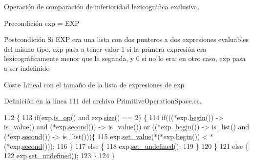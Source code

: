 Operación de comparación de inferioridad lexicográfica exclusiva. 

\begin{DoxyPrecond}{Precondición}
\textquotesingle{}exp\textquotesingle{} = \textquotesingle{}E\+XP\textquotesingle{} 
\end{DoxyPrecond}
\begin{DoxyPostcond}{Postcondición}
Si \textquotesingle{}E\+XP\textquotesingle{} era una lista con dos punteros a dos expresiones evaluables del mismo tipo, \textquotesingle{}exp\textquotesingle{} pasa a tener valor 1 si la primera expresión era lexicográficamente menor que la segunda, y 0 si no lo era; en otro caso, \textquotesingle{}exp\textquotesingle{} pasa a ser indefinido 
\end{DoxyPostcond}
\begin{DoxyParagraph}{Coste}
Lineal con el tamaño de la lista de expresiones de \textquotesingle{}exp\textquotesingle{} 
\end{DoxyParagraph}


Definición en la línea 111 del archivo Primitive\+Operation\+Space.\+cc.


\begin{DoxyCode}
112 \{
113   \textcolor{keywordflow}{if}(exp.\hyperlink{class_expression_a422fb496720b177eaed37a9694613384}{is\_op}() and exp.\hyperlink{class_expression_a0e8980139631cf7bc9fd3bca9d8caddc}{size}() == 2) \{
114     \textcolor{keywordflow}{if}(((*exp.\hyperlink{class_expression_a0ed7767d72f93c9121bb73afead5782a}{begin}()) -> is\_value() and (*exp.\hyperlink{class_expression_ae53f7febf676d564d6393bf2762fc08e}{second}()) -> is\_value()) or ((*exp.
      \hyperlink{class_expression_a0ed7767d72f93c9121bb73afead5782a}{begin}()) -> is\_list() and (*exp.\hyperlink{class_expression_ae53f7febf676d564d6393bf2762fc08e}{second}()) -> is\_list()))\{
115       exp.\hyperlink{class_expression_a307683cc3735bf81d823931aab2d64e0}{set\_value}(*(*exp.\hyperlink{class_expression_a0ed7767d72f93c9121bb73afead5782a}{begin}()) < *(*exp.\hyperlink{class_expression_ae53f7febf676d564d6393bf2762fc08e}{second}()));
116     \}
117     \textcolor{keywordflow}{else} \{
118       exp.\hyperlink{class_expression_a1d3ddfe83d20f47930792807e8b22248}{set\_undefined}();
119     \}
120   \}
121   \textcolor{keywordflow}{else} \{
122     exp.\hyperlink{class_expression_a1d3ddfe83d20f47930792807e8b22248}{set\_undefined}();
123   \}
124 \}
\end{DoxyCode}
